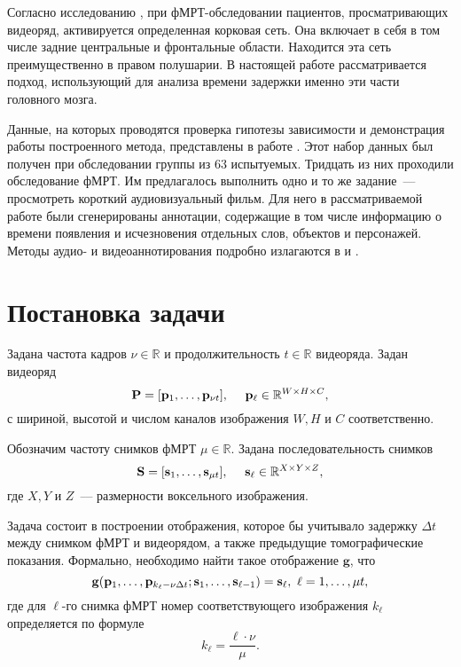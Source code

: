 \documentclass[a4paper, 12pt]{extarticle}
\begin{document}
Согласно исследованию \citep{anderson2006}, при фМРТ-обследовании пациентов,
просматривающих видеоряд, активируется определенная корковая сеть. Она включает
в себя в том числе задние центральные и фронтальные области. Находится эта сеть
преимущественно в правом полушарии. В настоящей работе рассматривается подход,
использующий для анализа времени задержки именно эти части головного мозга.

Данные, на которых проводятся проверка гипотезы зависимости и демонстрация работы построенного
метода, представлены в работе \citep{Berezutskaya2022}. Этот набор данных был получен при
обследовании группы из 63 испытуемых. Тридцать из них проходили обследование фМРТ.
Им предлагалось выполнить одно и то же задание~--- просмотреть короткий аудиовизуальный фильм.
Для него в рассматриваемой работе были сгенерированы аннотации, содержащие в том числе информацию о времени появления и исчезновения
отдельных слов, объектов и персонажей. Методы аудио- и видеоаннотирования подробно излагаются в
\citep{boersma2018praat} и \citep{Berezutskaya2020}.

\section{Постановка задачи}

Задана частота кадров $\nu \in \mathbb{R}$ и продолжительность $t \in \mathbb{R}$ видеоряда.
Задан видеоряд
\begin{equation}
	\label{eq1}
	\mathbf{P} = [\mathbf{p}_1, \ldots, \mathbf{p}_{\nu t}], \quad\
	\mathbf{p}_{\ell} \in \mathbb{R}^{W \times H \times C},
\end{equation}
с шириной, высотой и числом каналов изображения $W, H$ и
$C$ соответственно.

Обозначим частоту снимков фМРТ $\mu \in \mathbb{R}$. Задана последовательность снимков
\begin{equation}
	\label{eq2}
	\mathbf{S} = [\mathbf{s}_1, \ldots, \mathbf{s}_{\mu t}], \quad\
	\mathbf{s}_{\ell} \in \mathbb{R}^{X \times Y \times Z},
\end{equation}
где $X, Y$ и $Z$~--- размерности воксельного изображения.

Задача состоит в построении отображения, которое бы учитывало задержку $\Delta t$ между
снимком фМРТ и видеорядом, а также предыдущие томографические показания. Формально, необходимо
найти такое отображение $\mathbf{g}$, что
\begin{equation}
	\label{eq3}
	\mathbf{g}(\mathbf{p}_1, \ldots, \mathbf{p}_{k_{\ell} - \nu \Delta t}; \mathbf{s}_1, \ldots, \mathbf{s}_{\ell-1}) = \mathbf{s}_{\ell},
	\ \ell = 1, \ldots, \mu t,
\end{equation}
где для $\ell$-го снимка фМРТ номер соответствующего изображения $k_{\ell}$ определяется по формуле
\begin{equation}
	\label{eq4}
	k_{\ell} = \dfrac{\ell \cdot \nu}{\mu}.
\end{equation}
\end{document}
